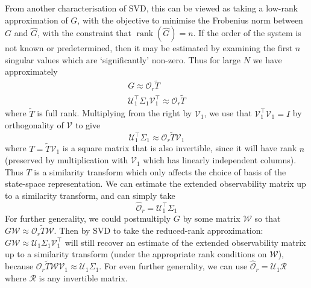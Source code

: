 \documentclass[11pt]{report} %
\begin{document}
From another characterisation of SVD, this can be viewed as taking a low-rank approximation of $G$, with the objective to minimise the Frobenius norm between $G$ and $\widehat{G}$, with the constraint that $\operatorname{rank}\left(\widehat{G}\right) = n$. If the order of the system is not known or predetermined, then it may be estimated by examining the first $n$ singular values which are `significantly' non-zero. Thus for large $N$ we have approximately
\begin{gather}
G \approx \mathcal{O}_{r}\widetilde{T} \\
\mathcal{U}_{1}^{\top}\Sigma_{1}\mathcal{V}_{1}^{\top} \approx \mathcal{O}_{r}\widetilde{T}
\end{gather}
where $\widetilde{T}$ is full rank. Multiplying from the right by $\mathcal{V}_{1}$, we use that $\mathcal{V}_{1}^{\top}\mathcal{V}_{1} = I$ by orthogonality of $\mathcal{V}$ to give
\begin{equation}
\mathcal{U}_{1}^{\top}\Sigma_{1} \approx \mathcal{O}_{r}\widetilde{T}\mathcal{V}_{1} 
\end{equation}
where $T = \widetilde{T}\mathcal{V}_{1}$ is a square matrix that is also invertible, since it will have rank $n$ (preserved by multiplication with $\mathcal{V}_{1}$ which has linearly independent columns). Thus $T$ is a similarity transform which only affects the choice of basis of the state-space representation. We can estimate the extended observability matrix up to a similarity transform, and can simply take
\begin{equation}
\widehat{\mathcal{O}}_{r} = \mathcal{U}_{1}^{\top}\Sigma_{1}
\end{equation}
For further generality, we could postmultiply $G$ by some matrix $\mathcal{W}$ so that $G\mathcal{W} \approx \mathcal{O}_{r}\widetilde{T}\mathcal{W}$. Then by SVD to take the reduced-rank approximation: $G\mathcal{W} \approx \mathcal{U}_{1}\Sigma_{1}\mathcal{V}_{1}^{\top}$ will still recover an estimate of the extended observability matrix up to a similarity transform (under the appropriate rank conditions on $\mathcal{W}$), because $\mathcal{O}_{r}\widetilde{T}\mathcal{W}\mathcal{V}_{1} \approx \mathcal{U}_{1}\Sigma_{1}$. For even further generality, we can use $\widehat{\mathcal{O}}_{r} = \mathcal{U}_{1}\mathcal{R}$ where $\mathcal{R}$ is any invertible matrix. \\
\end{document}
